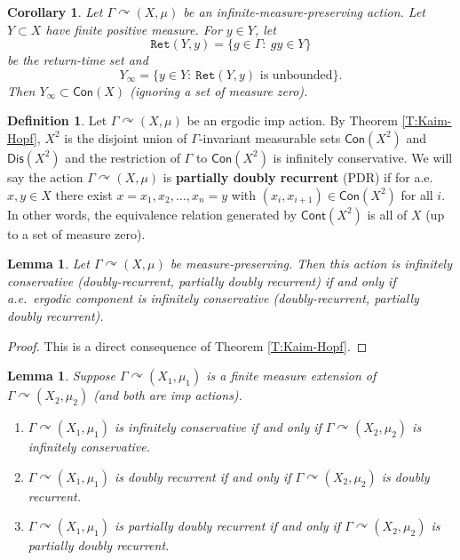 \documentclass[12pt]{article}
\theoremstyle{plain}
\newtheorem{lem}[thm]{Lemma}
\newtheorem{cor}[thm]{Corollary}
\theoremstyle{definition}
\newtheorem{defn}{Definition}
\theoremstyle{remark}
\newcommand{\G}{\Gamma}
\newcommand\Ret{\mathtt{Ret}}
\def\cc{{\curvearrowright}}
\begin{document}
\begin{cor}\label{C:return-time}
     Let $\G \cc (X,\mu)$ be an infinite-measure-preserving action. Let $Y \subset X$ have finite positive measure. For $y\in Y$, let 
 $$\Ret(Y,y)=\{g\in \G:~ gy \in Y\}$$
 be the return-time set and 
 $$Y_\infty = \{y \in Y:~ \Ret(Y,y) \textrm{ is unbounded} \}.$$
 Then $Y_\infty \subset \mathsf{Con}(X)$ (ignoring a set of measure zero).
\end{cor}

\begin{defn}
    Let $\G \cc (X,\mu)$ be an ergodic imp  action. By Theorem \ref{T:Kaim-Hopf}, $X^2$ is the disjoint union of $\G$-invariant measurable sets $\mathsf{Con}(X^2)$ and $\mathsf{Dis}(X^2)$ and the restriction of $\G$ to $\mathsf{Con}(X^2)$ is infinitely conservative. We will say the action $\G \cc (X,\mu)$ is {\bf partially doubly recurrent} (PDR) if for a.e.\ $x,y \in X$ there exist $x=x_1,x_2,\ldots, x_n=y$ with $(x_i,x_{i+1})\in \mathsf{Con}(X^2)$ for all $i$. In other words, the equivalence relation generated by $\mathsf{Cont}(X^2)$ is all of $X$ (up to a set of measure zero). 
\end{defn}

\begin{lem}\label{L:conserv-erg-dec}
Let $\G \cc (X,\mu)$ be measure-preserving. Then this action is infinitely conservative (doubly-recurrent, partially doubly recurrent) if and only if a.e.\ ergodic component is infinitely conservative (doubly-recurrent, partially doubly recurrent).
\end{lem}

\begin{proof}
This is a direct consequence of Theorem \ref{T:Kaim-Hopf}.
\end{proof}



\begin{lem}\label{L:finitemeasureextension}
Suppose $\G \cc (X_1,\mu_1)$ is a finite measure extension of $\G \cc (X_2,\mu_2)$ (and both are imp actions). 
\begin{enumerate}
\item $\G \cc (X_1,\mu_1)$ is infinitely conservative if and only if $\G \cc (X_2,\mu_2)$ is infinitely conservative.
\item $\G \cc (X_1,\mu_1)$ is doubly recurrent if and only if $\G \cc (X_2,\mu_2)$ is doubly recurrent.
\item $\G \cc (X_1,\mu_1)$ is partially doubly recurrent if and only if $\G \cc (X_2,\mu_2)$ is partially doubly recurrent.
\end{enumerate}
\end{lem}
\end{document}
